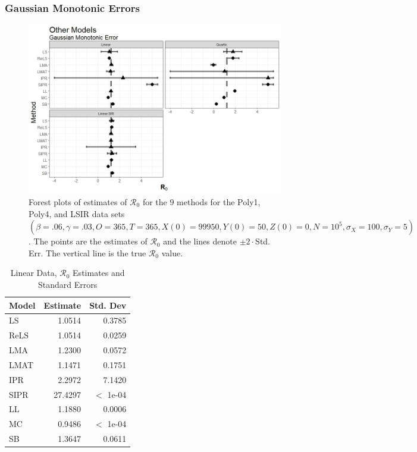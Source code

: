 \documentclass[12pt]{article}
\newcommand{\xxsir}{\ensuremath{9} } %
\newcommand{\rr}{\ensuremath{\mathcal{R}_0}}
\begin{document}
\subsubsection{Gaussian Monotonic Errors}

\begin{figure}[H]
	\begin{center}
		\includegraphics[scale=0.5]{images/other_nm.jpeg}
		\caption{Forest plots of estimates of $\rr$ for the \xxsir methods for the Poly1, Poly4, and LSIR data sets $(\beta=.06, \gamma=.03, O=365, T=365, X(0)=99950, Y(0)=50, Z(0)=0, N=10^5, \sigma_X=100, \sigma_Y=5)$.  The points are the estimates of $\rr$ and the lines denote $\pm 2\cdot $Std. Err.  The vertical line is the true $\rr$ value.}
	\end{center}
\end{figure}

\begin{table}[H]
	
	\centering
	\begin{tabular}[t]{l|r|r}
		\hline
		Model & Estimate & Std. Dev\\
		\hline
		LS & 1.0514 & 0.3785\\
		\hline
		ReLS & 1.0514 & 0.0259\\
		\hline
		LMA & 1.2300 & 0.0572\\
		\hline
		LMAT & 1.1471 & 0.1751\\
		\hline
		IPR & 2.2972 & 7.1420\\
		\hline
		SIPR & 27.4297 & $<$ 1e-04\\
		\hline
		LL & 1.1880 & 0.0006\\
		\hline
		MC & 0.9486 & $<$ 1e-04\\
		\hline
		SB & 1.3647 & 0.0611\\
		\hline
	\end{tabular}
	\caption{Linear Data, $\rr$ Estimates and Standard Errors}
\end{table}
\end{document}
